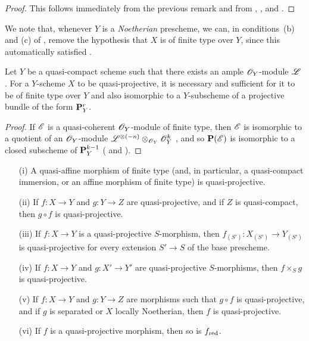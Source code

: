 \begin{proof}
\label{proof-II.5.3.2}
This follows immediately from the previous remark and from , , and .
\end{proof}

We note that, whenever $Y$ is a \emph{Noetherian} prescheme, we can, in conditions~(b) and (c) of , remove the hypothesis that $X$ is of finite type over $Y$, since this automatically satisfied .

\begin{corollary}[5.3.3]
\label{II.5.3.3}
Let $Y$ be a quasi-compact scheme such that there exists an ample $\mathscr{O}_Y$-module $\mathscr{L}$ .
For a $Y$-scheme $X$ to be quasi-projective, it is necessary and sufficient for it to be of finite type over $Y$ and also isomorphic to a $Y$-subscheme of a projective bundle of the form $\mathbf{P}_Y^r$.
\end{corollary}

\begin{proof}
\label{proof-II.5.3.3}
If $\mathscr{E}$ is a quasi-coherent $\mathscr{O}_Y$-module of finite type, then $\mathscr{E}$ is isomorphic to a quotient of an $\mathscr{O}_Y$-module $\mathscr{L}^{\otimes(-n)}\otimes_{\mathscr{O}_Y}\mathscr{O}_Y^k$ , and so $\mathbf{P}(\mathscr{E})$ is isomorphic to a closed subscheme of $\mathbf{P}_Y^{k-1}$ ( and ).
\end{proof}

\begin{proposition}[5.3.4]
\label{II.5.3.4}
\medskip\noindent
\begin{enumerate}
  \item[{\rm(i)}] A quasi-affine morphism of finite type (and, in particular, a quasi-compact immersion, or an affine morphism of finite type) is quasi-projective.
  \item[{\rm(ii)}] If $f:X\to Y$ and $g:Y\to Z$ are quasi-projective, and if $Z$ is quasi-compact, then $g\circ f$ is quasi-projective.
  \item[{\rm(iii)}] If $f:X\to Y$ is a quasi-projective $S$-morphism, then $f_{(S')}:X_{(S')}\to Y_{(S')}$ is quasi-projective for every extension $S'\to S$ of the base prescheme.
  \item[{\rm(iv)}] If $f:X\to Y$ and $g:X'\to Y'$ are quasi-projective $S$-morphisms, then $f\times_S g$ is quasi-projective.
  \item[{\rm(v)}] If $f:X\to Y$ and $g:Y\to Z$ are morphisms such that $g\circ f$ is quasi-projective, and if $g$ is separated or $X$ locally Noetherian, then $f$ is quasi-projective.
  \item[{\rm(vi)}] If $f$ is a quasi-projective morphism, then so is $f_{\mathrm{red}}$.
\end{enumerate}
\end{proposition}

